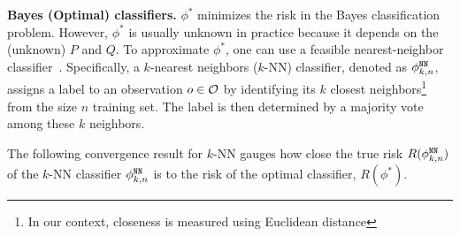 \smallskip

\noindent \textbf{Bayes (Optimal) classifiers.} $\phi^*$ minimizes the risk in the Bayes classification problem. However, $\phi^*$ is usually unknown in practice because it depends on the (unknown) $P$ and $Q$. To approximate $\phi^*$, one can use a feasible nearest-neighbor classifier~\cite{altman1992introduction}. Specifically, a $k$-nearest neighbors ($k$-NN) classifier, denoted as $\phi^{\mathtt{NN}}_{k, n}$, assigns a label to an observation $o \in \mathcal{O}$ by identifying its $k$ closest neighbors\footnote{In our context, closeness is measured using Euclidean distance} from the size $n$ training set. The label is then determined by a majority vote among these $k$ neighbors.




The following convergence result for $k$-NN gauges how close the true risk $R(\phi^{\mathtt{NN}}_{k, n})$ of the $k$-NN classifier $\phi^{\mathtt{NN}}_{k, n}$ is to the risk of the optimal classifier, $R(\phi^{*})$. 


